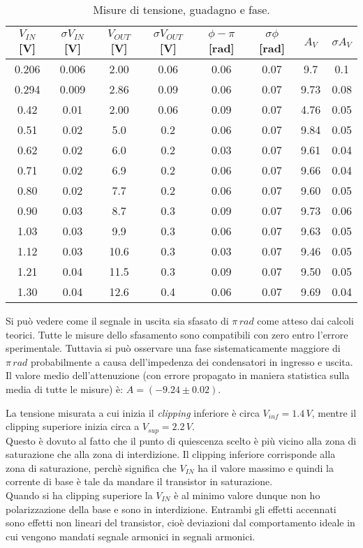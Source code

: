 \documentclass[10pt,a4paper]{article}
\begin{document}
\begin{table}[!hbt]
\centering
\begin{tabular}{|c|c|c|c|c|c|c|c|}
\hline 
$V_{IN}$ [V] & $\sigma V_{IN}$ [V] & $V_{OUT}$ [V]& $\sigma V_{OUT}$ [V] & $\phi - \pi$ [rad] & $\sigma \phi$ [rad] & $A_V$ & $\sigma A_V$ \\ 
\hline
0.206 & 0.006 & 2.00 & 0.06 & 0.06 & 0.07 & 9.7 & 0.1\\
0.294 & 0.009 & 2.86 & 0.09 & 0.06 & 0.07 & 9.73 & 0.08\\
0.42 & 0.01 & 2.00 & 0.06 & 0.09 & 0.07 & 4.76 & 0.05\\
0.51 & 0.02 & 5.0 & 0.2 & 0.06 & 0.07 & 9.84 & 0.05\\
0.62 & 0.02 & 6.0 & 0.2 & 0.03 & 0.07 & 9.61 & 0.04\\
0.71 & 0.02 & 6.9 & 0.2 & 0.06 & 0.07 & 9.66 & 0.04\\
0.80 & 0.02 & 7.7 & 0.2 & 0.06 & 0.07 & 9.60 & 0.05\\
0.90 & 0.03 & 8.7 & 0.3 & 0.09 & 0.07 & 9.73 & 0.06\\
1.03 & 0.03 & 9.9 & 0.3 & 0.06 & 0.07 & 9.63 & 0.05\\
1.12 & 0.03 & 10.6 & 0.3 & 0.03 & 0.07 & 9.46 & 0.05\\
1.21 & 0.04 & 11.5 & 0.3 & 0.09 & 0.07 & 9.50 & 0.05\\
1.30 & 0.04 & 12.6 & 0.4 & 0.06 & 0.07 & 9.69 & 0.04\\
\hline
\end{tabular}
\caption{Misure di tensione, guadagno e fase.} \label{ampiezza}
\end{table}
Si può vedere come il segnale in uscita sia sfasato di $\pi \, rad$ come atteso dai calcoli teorici. Tutte le misure dello sfasamento sono compatibili con zero entro l'errore sperimentale. Tuttavia si può osservare una fase sistematicamente maggiore di $\pi \, rad$ probabilmente a causa dell'impedenza dei condensatori in ingresso e uscita. Il valore medio dell'attenuzione (con errore propagato in maniera statistica sulla media di tutte le misure) è: $A = (-9.24 \pm 0.02)$.

La tensione misurata a cui inizia il \emph{clipping} inferiore è circa $V_{inf} = 1.4 \,V$, mentre il clipping superiore inizia circa a $V_{sup} = 2.2 \, V$.\\
Questo è dovuto al fatto che il punto di quiescenza scelto è più vicino alla zona di saturazione che alla zona di interdizione. Il clipping inferiore corrisponde alla zona di saturazione, perchè significa che $V_{IN}$ ha il valore massimo e quindi la corrente di base è tale da mandare il transistor in saturazione.\\
Quando si ha clipping superiore la $V_{IN}$ è al minimo valore dunque non ho polarizzazione della base e sono in interdizione.
Entrambi gli effetti accennati sono effetti non lineari del transistor, cioè deviazioni dal comportamento ideale in cui vengono mandati segnale armonici in segnali armonici.\\
\end{document}
